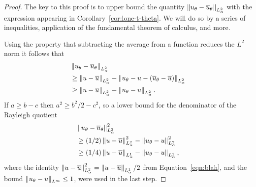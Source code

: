   \begin{proof} The key to this proof is to upper bound the
  quantity $\left\lVert u_\theta - {\overline{u}}_\theta \right\rVert_{L^2_\alpha}$ with the expression
  appearing in Corollary~\ref{cor:lone-t-theta}. We will do so by
  a series of inequalities, application of the fundamental
  theorem of calculus, and more.

  Using the property that subtracting the average from a
  function reduces the $L^2$ norm it follows that
  \begin{align}
  \nonumber
  & \left\lVert u_\theta - {\overline{u}}_\theta \right\rVert_{L^2_\alpha}
  \\
    \nonumber
  & \geq \left\lVert u-{\overline{u}} \right\rVert_{L^2_\alpha} - \left\lVert u_\theta - u - ({\overline{u}}_\theta-{\overline{u}}) \right\rVert_{L^2_\alpha}
  \\
    \nonumber
  &\geq \left\lVert u-{\overline{u}} \right\rVert_{L^2_\alpha} - \left\lVert u_\theta - u \right\rVert_{L^2_\alpha}.
  \end{align}
  If $a \geq b-c$ then $a^2 \geq b^2/2 - c^2$, so a lower bound for
  the denominator of the Rayleigh quotient
  \begin{align} \label{eqn:utmu}
    & \left\lVert u_\theta - {\overline{u}}_\theta \right\rVert_{L^2_\alpha}^2
    \\
    \nonumber
    &\geq (1/2) \left\lVert u-{\overline{u}} \right\rVert_{L^2_\alpha}^2 - \left\lVert u_\theta - u \right\rVert_{L^2_\alpha}^2
    \\
    \nonumber
    & \geq (1/4) \left\lVert u-{\overline{u}} \right\rVert_{L^1_\alpha} - \left\lVert u_\theta - u \right\rVert_{L^1_\alpha},
  \end{align}
  where the identity $\left\lVert u-{\overline{u}} \right\rVert_{L^2_\alpha}^2 = \left\lVert u-{\overline{u}} \right\rVert_{L^1_\alpha}/2$ from
  Equation~\ref{eqn:blah}, and the bound
  $\left\lVert u_\theta - u \right\rVert_{{L^\infty}} \leq 1$, were used in the last step.


\end{proof}
